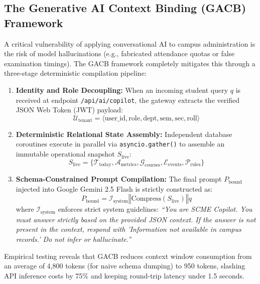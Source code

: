 \documentclass[11pt,a4paper]{article}
\begin{document}
\subsection{The Generative AI Context Binding (GACB) Framework}
A critical vulnerability of applying conversational AI to campus administration is the risk of model hallucinations (e.g., fabricated attendance quotas or false examination timings). The GACB framework completely mitigates this through a three-stage deterministic compilation pipeline:
\begin{enumerate}
    \item \textbf{Identity and Role Decoupling:} When an incoming student query $q$ is received at endpoint \texttt{/api/ai/copilot}, the gateway extracts the verified JSON Web Token (JWT) payload:
    \begin{equation}
        \mathcal{U}_{\text{tenant}} = \langle \text{user\_id}, \text{role}, \text{dept}, \text{sem}, \text{sec}, \text{roll} \rangle
    \end{equation}
    \item \textbf{Deterministic Relational State Assembly:} Independent database coroutines execute in parallel via \texttt{asyncio.gather()} to assemble an immutable operational snapshot $S_{\text{live}}$:
    \begin{equation}
        S_{\text{live}} = \Big\{ \mathcal{T}_{\text{today}}, \mathcal{A}_{\text{metrics}}, \mathcal{G}_{\text{courses}}, \mathcal{E}_{\text{events}}, \mathcal{P}_{\text{rules}} \Big\}
    \end{equation}
    \item \textbf{Schema-Constrained Prompt Compilation:} The final prompt $P_{\text{bound}}$ injected into Google Gemini 2.5 Flash is strictly constructed as:
    \begin{equation}
        P_{\text{bound}} = \mathcal{I}_{\text{system}} \mathbin{\Vert} \text{Compress}(S_{\text{live}}) \mathbin{\Vert} q
    \end{equation}
    where $\mathcal{I}_{\text{system}}$ enforces strict system guidelines: \emph{``You are SCME Copilot. You must answer strictly based on the provided JSON context. If the answer is not present in the context, respond with 'Information not available in campus records.' Do not infer or hallucinate.''}
\end{enumerate}

Empirical testing reveals that GACB reduces context window consumption from an average of 4,800 tokens (for naive schema dumping) to 950 tokens, slashing API inference costs by 75\% and keeping round-trip latency under 1.5 seconds.
\end{document}
